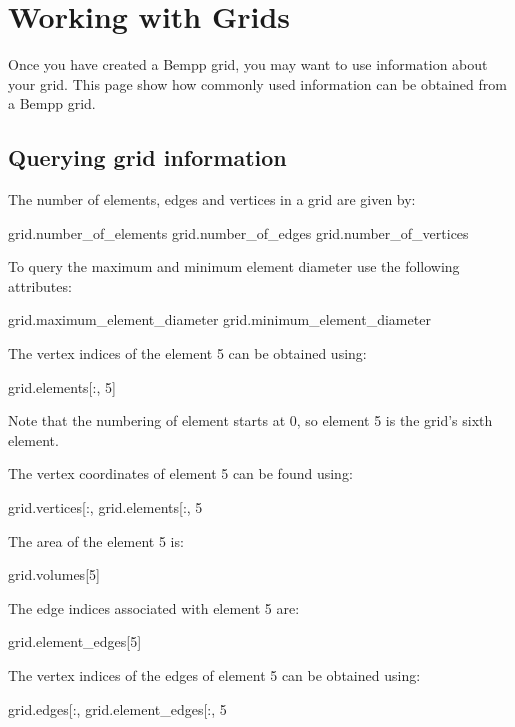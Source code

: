 \documentclass[a4paper]{book}
\begin{document}
\section{Working with Grids}

Once you have created a Bempp grid, you may want to use information about your grid.
This page show how commonly used information can be obtained from a Bempp grid.

\subsection{ Querying grid information}
The number of elements, edges and vertices in a grid are given by:

\begin{python}
grid.number_of_elements
grid.number_of_edges
grid.number_of_vertices
\end{python}

To query the maximum and minimum element diameter use the following attributes:

\begin{python}
grid.maximum_element_diameter
grid.minimum_element_diameter
\end{python}

The vertex indices of the element 5 can be obtained using:

\begin{python}
grid.elements[:, 5]
\end{python}

Note that the numbering of element starts at 0, so element 5 is the grid's sixth element.

The vertex coordinates of element 5 can be found using:

\begin{python}
grid.vertices[:, grid.elements[:, 5\]
\end{python}

The area of the element 5 is:

\begin{python}
grid.volumes[5]
\end{python}

The edge indices associated with element 5 are:

\begin{python}
grid.element_edges[5]
\end{python}

The vertex indices of the edges of element 5 can be obtained using:

\begin{python}
grid.edges[:, grid.element_edges[:, 5\]
\end{python}
\end{document}
